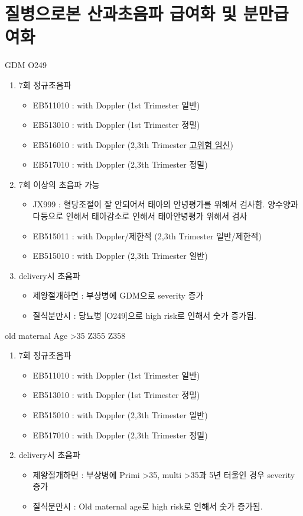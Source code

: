 \section{질병으로본 산과초음파 급여화 및 분만급여화}
\begin{commentbox}{GDM O249}
\begin{enumerate}\tightlist
\item 7회 정규초음파
	\begin{itemize}\tightlist
	\item EB511010 : with Doppler (1st Trimester 일반) 
	\item EB513010 : with Doppler (1st Trimester 정밀) 
	\item EB516010 : with Doppler (2,3th Trimester \uline{고위험 임신}) 
	\item EB517010 : with Doppler (2,3th Trimester 정밀) 
	\end{itemize}
\item 7회 이상의 초음파 가능
	\begin{itemize}\tightlist
	\item JX999 : 혈당조절이 잘 안되어서 태아의 안녕평가를 위해서 검사함. 양수양과다등으로 인해서 태아감소로 인해서 태아안녕평가 위해서 검사 
	\item EB515011 : with Doppler/제한적 (2,3th Trimester 일반/제한적)
	\item EB515010 : with Doppler (2,3th Trimester 일반)
	\end{itemize}
\item delivery시 초음파
	\begin{itemize}\tightlist
	\item 제왕절개하면 : 부상병에 GDM으로 severity 증가
	\item 질식분만시 : 당뇨병 [O249]으로 high risk로 인해서 숫가 증가됨.
	\end{itemize}
\end{enumerate}
\end{commentbox}
\par
\medskip
\begin{commentbox}{old maternal Age \textgreater 35 Z355 Z358}
\begin{enumerate}\tightlist
\item 7회 정규초음파
	\begin{itemize}\tightlist
	\item EB511010 : with Doppler (1st Trimester 일반) 
	\item EB513010 : with Doppler (1st Trimester 정밀) 
	\item EB515010 : with Doppler (2,3th Trimester 일반)
	\item EB517010 : with Doppler (2,3th Trimester 정밀) 
	\end{itemize}
\item delivery시 초음파
	\begin{itemize}\tightlist
	\item 제왕절개하면 : 부상병에 Primi  \textgreater 35, multi  \textgreater 35과 5년 터울인 경우 severity 증가
	\item 질식분만시 : Old maternal age로 high risk로 인해서 숫가 증가됨.
	\end{itemize}
\end{enumerate}
\end{commentbox}
